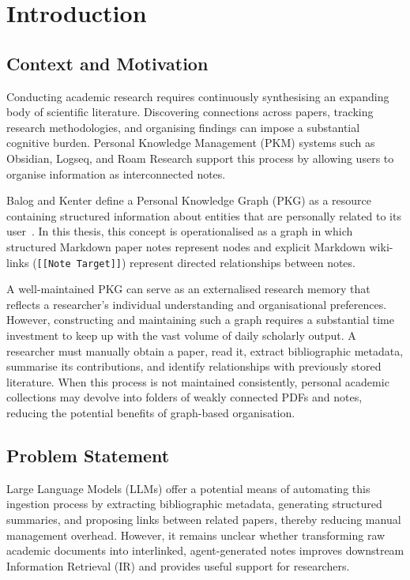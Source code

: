 \documentclass[runningheads]{llncs}
\begin{document}
\section{Introduction}
\label{sec:intro}

\subsection{Context and Motivation}

Conducting academic research requires continuously synthesising an expanding body of scientific literature. Discovering connections across papers, tracking research methodologies, and organising findings can impose a substantial cognitive burden. Personal Knowledge Management (PKM) systems such as Obsidian, Logseq, and Roam Research support this process by allowing users to organise information as interconnected notes.

Balog and Kenter define a Personal Knowledge Graph (PKG) as a resource containing structured information about entities that are personally related to its user~\cite{balog2019personal}. In this thesis, this concept is operationalised as a graph in which structured Markdown paper notes represent nodes and explicit Markdown wiki-links (\texttt{[[Note Target]]}) represent directed relationships between notes.

A well-maintained PKG can serve as an externalised research memory that reflects a researcher's individual understanding and organisational preferences. However, constructing and maintaining such a graph requires a substantial time investment to keep up with the vast volume of daily scholarly output. A researcher must manually obtain a paper, read it, extract bibliographic metadata, summarise its contributions, and identify relationships with previously stored literature. When this process is not maintained consistently, personal academic collections may devolve into folders of weakly connected PDFs and notes, reducing the potential benefits of graph-based organisation.

\subsection{Problem Statement}

Large Language Models (LLMs) offer a potential means of automating this ingestion process by extracting bibliographic metadata, generating structured summaries, and proposing links between related papers, thereby reducing manual management overhead. However, it remains unclear whether transforming raw academic documents into interlinked, agent-generated notes improves downstream Information Retrieval (IR) and provides useful support for researchers.
\end{document}
